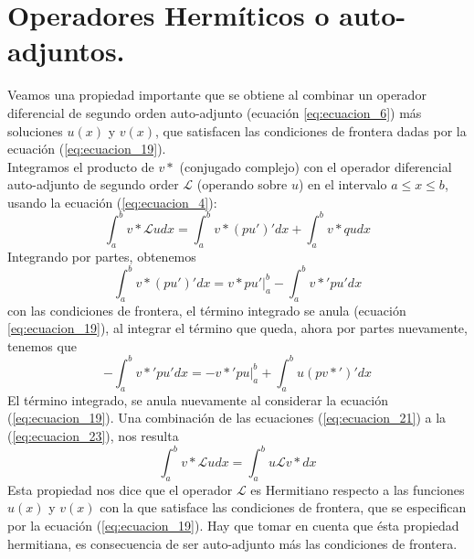 \section{Operadores Hermíticos o auto-adjuntos.}
Veamos una propiedad importante que se obtiene al combinar un operador diferencial de segundo orden auto-adjunto (ecuación \ref{eq:ecuacion_6}) más soluciones $u(x)$ y $v(x)$, que satisfacen las condiciones de frontera dadas por la ecuación (\ref{eq:ecuacion_19}).
\\
Integramos el producto de $v*$ (conjugado complejo) con el operador diferencial auto-adjunto de segundo order $\mathscr{L}$ (operando sobre $u$) en el intervalo $a \leq x \leq b$, usando la ecuación (\ref{eq:ecuacion_4}):
\begin{equation}
\int_{a}^{b} v* \mathscr{L} u dx = \int_{a}^{b} v* (pu')' dx + \int_{a}^{b} v* qu dx
\label{eq:ecuacion_21}
\end{equation}
Integrando por partes, obtenemos
\begin{equation}
\int_{a}^{b} v*(pu')' dx = v* pu' \bigg\vert_{a}^{b} - \int_{a}^{b} v*' pu' dx
\label{eq:ecuacion_22}
\end{equation}
con las condiciones de frontera, el término integrado se anula (ecuación \ref{eq:ecuacion_19}), al integrar el término que queda, ahora por partes nuevamente, tenemos que
\begin{equation}
- \int_{a}^{b} v*' pu' dx = - v*' pu \bigg\vert_{a}^{b} + \int_{a}^{b} u(pv*')' dx
\label{eq:ecuacion_23}
\end{equation}
El término integrado, se anula nuevamente al considerar la ecuación (\ref{eq:ecuacion_19}). Una combinación de las ecuaciones (\ref{eq:ecuacion_21}) a la (\ref{eq:ecuacion_23}), nos resulta
\begin{equation}
\int_{a}^{b} v* \mathscr{L} u dx = \int_{a}^{b} u \mathscr{L} v* dx
\label{eq:ecuacion_24}
\end{equation}
Esta propiedad nos dice que el operador $\mathscr{L}$ es Hermitiano respecto a las funciones $u(x)$ y $v(x)$ con la que satisface las condiciones de frontera, que se especifican por la ecuación (\ref{eq:ecuacion_19}). Hay que tomar en cuenta que ésta propiedad hermitiana, es consecuencia de ser auto-adjunto más las condiciones de frontera.
